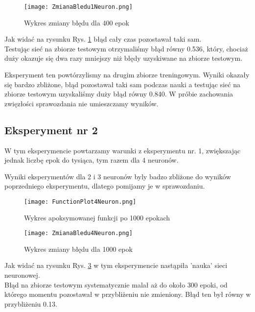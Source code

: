 \documentclass[12pt]{article}
\begin{document}
\begin{figure}[!htb]
 \centering
 \texttt{[image: ZmianaBledu1Neuron.png]}
 \vspace{-0.3cm}
 \caption{Wykres zmiany błędu dla 400 epok}
 \label{WykresBlad1}
\end{figure}

\newpage
Jak widać na rysunku Rys. \ref{WykresBlad1} błąd cały czas pozostawał taki sam.\\

Testując sieć na zbiorze testowym otrzymaliśmy błąd równy 0.536, który, chociaż duży okazuje się dwa razy mniejszy niż błędy uzyskiwane na zbiorze testowym.

Eksperyment ten powtórzylismy na drugim zbiorze treningowym. Wyniki okazały się bardzo zbliżone, błąd pozostawał taki sam podczas nauki a testując sieć na zbiorze testowym uzyskaliśmy duży błąd równy 0.840.  W próbie zachowania zwięzłości sprawozdania nie umieszczamy wyników.

\newpage

\subsection{Eksperyment nr 2}
W tym eksperymencie powtarzamy warunki z eksperymentu nr. 1, zwiększając jednak liczbę epok do tysiąca, tym razem dla 4 neuronów. 

Wyniki eksperymentów dla 2 i 3 neuronów byly badzo zbliżone do wyników poprzedniego eksperymentu, dlatego pomijamy je w sprawozdaniu.

\begin{figure}[!htb]
 \centering
 \texttt{[image: FunctionPlot4Neuron.png]}
 \caption{Wykres apoksymowanej funkcji po 1000 epokach}
 \vspace{-0.3cm}
 \label{WykresFun2}
\end{figure}



\begin{figure}[!htb]
 \centering
 \texttt{[image: ZmianaBledu4Neuron.png]}
 \vspace{-0.3cm}
 \caption{Wykres zmiany błędu dla 1000 epok}
 \label{WykresBlad2}
\end{figure}


\newpage
Jak widać na rysunku Rys. \ref{WykresBlad2} w tym eksperymencie nastąpiła 'nauka' sieci neuronowej.\\

Błąd na zbiorze testowym systematycznie malał aż do około 300 epoki, od którego momentu pozostawał w przybliżeniu nie zmieniony. Błąd ten był równy w przybliżeniu 0.13.
\end{document}
